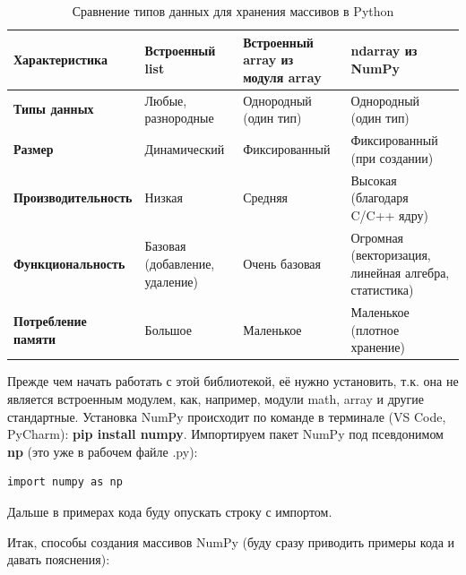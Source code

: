 \documentclass[pract]{SCWorks}
\begin{document}
\begin{table}[ht]
\centering
\caption{Сравнение типов данных для хранения массивов в Python}
\begin{tabular}{|p{4.7cm}|p{3.3cm}|p{3.3cm}|p{3.5cm}|}
\hline
\textbf{Характеристика} & \textbf{Встроенный list} & \textbf{Встроенный array из модуля array} & \textbf{ndarray из NumPy} \\ \hline
\textbf{Типы данных} & Любые, разнородные & Однородный (один тип) & Однородный (один тип) \\ \hline
\textbf{Размер} & Динамический & Фиксированный & Фиксированный (при создании) \\ \hline
\textbf{Производительность} & Низкая & Средняя & Высокая (благодаря C/C++ ядру) \\ \hline
\textbf{Функциональность} & Базовая (добавление, удаление) & Очень базовая & Огромная (векторизация, линейная алгебра, статистика) \\ \hline
\textbf{Потребление памяти} & Большое & Маленькое & Маленькое (плотное хранение) \\ \hline
\end{tabular}
\label{tab:comparison}
\end{table}

Прежде чем начать работать с этой библиотекой, её нужно установить, т.к. она не является встроенным 
модулем, как, например, модули math, array и другие стандартные.  
Установка NumPy происходит по команде в терминале (VS Code, PyCharm): \textbf{pip install numpy}. Импортируем пакет 
NumPy под псевдонимом \textbf{np} (это уже в рабочем файле .py): 

\begin{verbatim}
import numpy as np  
\end{verbatim}

Дальше в примерах кода буду опускать строку с импортом.

Итак, способы создания массивов NumPy (буду сразу приводить примеры кода и давать пояснения):
\end{document}

